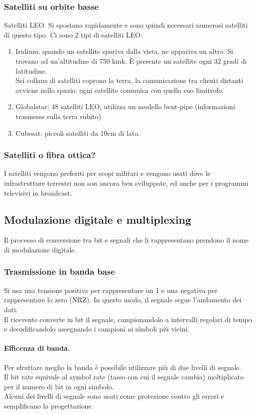 \documentclass{article}
\begin{document}
		\subsubsection{Satelliti su orbite basse}
		Satelliti LEO. Si spostano rapidamente e sono quindi necessari numerosi satelliti di questo tipo. Ci sono 2 tipi di satelliti LEO:
		\begin{enumerate}
			\item Iridium: quando un satellite spariva dalla vista, ne appariva un altro. Si trovano ad un'altitudine di 750 kmk. È presente un satellite ogni 32 gradi di latitudine. \\
			Sei collane di satelliti coprono la terra, la comunicazione tra clienti distanti avviene nello spazio: ogni satellite comunica con quello suo limitrofo.
			\item Globalstar: 48 satelliti LEO, utilizza un modello bent-pipe (informazioni trasmesse sulla terra subito).
			\item Cubesat: piccoli satelliti da 10cm di lato.
		\end{enumerate}
		\subsubsection{Satelliti o fibra ottica?}
		I satelliti vengono preferiti per scopi militari e vengono usati dove le infrastrutture terrestri non son ancora ben sviluppate, ed anche per i programmi televisivi in broadcast. 
		\subsection{Modulazione digitale e multiplexing}
		Il processo di conversione tra bit e segnali che li rappresentano prendono il nome di modulazione digitale. 
		\subsubsection{Trasmissione in banda base}
		Si usa una tensione positiva per rappresentare un 1 e una negativa per rappresentare lo zero (NRZ). In questo modo, il segnale segue l'andamento dei dati.\\
		Il ricevente converte in bit il segnale, campionandolo a intervalli regolari di tempo e decodificandolo assegnando i campioni ai simboli più vicini. 
		\paragraph{Efficenza di banda.}  Per sfruttare meglio la banda è possibile utilizzare più di due livelli di segnale. \\
		Il bit rate equivale al symbol rate (tasso con cui il segnale cambia) moltiplicato per il numero di bit in ogni simbolo. \\
		Alcuni dei livelli di segnale sono usati come protezione contro gli errori e semplificano la progettazione.
\end{document}
